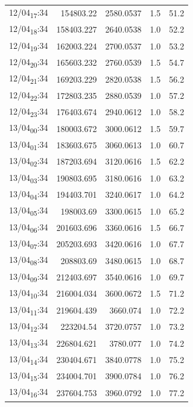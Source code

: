 \documentclass[11pt]{article}
\begin{document}
\begin{center}
\begin{tabular}{lrrrr}
12/04\textsubscript{17}:34 & 154803.22 & 2580.0537 & 1.5 & 51.2\\[0pt]
12/04\textsubscript{18}:34 & 158403.227 & 2640.0538 & 1.0 & 52.2\\[0pt]
12/04\textsubscript{19}:34 & 162003.224 & 2700.0537 & 1.0 & 53.2\\[0pt]
12/04\textsubscript{20}:34 & 165603.232 & 2760.0539 & 1.5 & 54.7\\[0pt]
12/04\textsubscript{21}:34 & 169203.229 & 2820.0538 & 1.5 & 56.2\\[0pt]
12/04\textsubscript{22}:34 & 172803.235 & 2880.0539 & 1.0 & 57.2\\[0pt]
12/04\textsubscript{23}:34 & 176403.674 & 2940.0612 & 1.0 & 58.2\\[0pt]
13/04\textsubscript{00}:34 & 180003.672 & 3000.0612 & 1.5 & 59.7\\[0pt]
13/04\textsubscript{01}:34 & 183603.675 & 3060.0613 & 1.0 & 60.7\\[0pt]
13/04\textsubscript{02}:34 & 187203.694 & 3120.0616 & 1.5 & 62.2\\[0pt]
13/04\textsubscript{03}:34 & 190803.695 & 3180.0616 & 1.0 & 63.2\\[0pt]
13/04\textsubscript{04}:34 & 194403.701 & 3240.0617 & 1.0 & 64.2\\[0pt]
13/04\textsubscript{05}:34 & 198003.69 & 3300.0615 & 1.0 & 65.2\\[0pt]
13/04\textsubscript{06}:34 & 201603.696 & 3360.0616 & 1.5 & 66.7\\[0pt]
13/04\textsubscript{07}:34 & 205203.693 & 3420.0616 & 1.0 & 67.7\\[0pt]
13/04\textsubscript{08}:34 & 208803.69 & 3480.0615 & 1.0 & 68.7\\[0pt]
13/04\textsubscript{09}:34 & 212403.697 & 3540.0616 & 1.0 & 69.7\\[0pt]
13/04\textsubscript{10}:34 & 216004.034 & 3600.0672 & 1.5 & 71.2\\[0pt]
13/04\textsubscript{11}:34 & 219604.439 & 3660.074 & 1.0 & 72.2\\[0pt]
13/04\textsubscript{12}:34 & 223204.54 & 3720.0757 & 1.0 & 73.2\\[0pt]
13/04\textsubscript{13}:34 & 226804.621 & 3780.077 & 1.0 & 74.2\\[0pt]
13/04\textsubscript{14}:34 & 230404.671 & 3840.0778 & 1.0 & 75.2\\[0pt]
13/04\textsubscript{15}:34 & 234004.701 & 3900.0784 & 1.0 & 76.2\\[0pt]
13/04\textsubscript{16}:34 & 237604.753 & 3960.0792 & 1.0 & 77.2\\[0pt]

\end{tabular}
\end{center}
\end{document}
